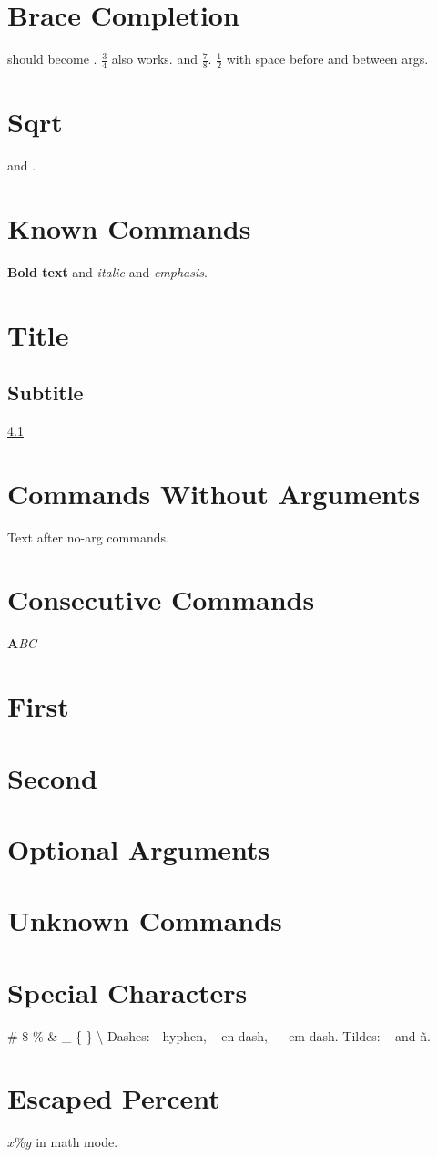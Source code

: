 \documentclass{article}
\begin{document}
\section{Brace Completion}
 should become .
 $\frac34$ also works.
 and $\frac78$.
$\frac 1 2$ with space before and between args.

\section{Sqrt}
 and .

\section{Known Commands}
\textbf{Bold text} and \textit{italic} and \emph{emphasis}.
\section{Title}
\subsection{Subtitle}
\label{sec:intro}
\ref{sec:intro}
\cite{key2024}

\section{Commands Without Arguments}
\centering
\bigskip
\noindent Text after no-arg commands.

\section{Consecutive Commands}
\textbf{A}\textit{B}\emph{C}
\section{First}\section{Second}
\label{sec:first}\label{sec:second}

\section{Optional Arguments}
\usepackage[utf8]{inputenc}

\section{Unknown Commands}
\unknown

\section{Special Characters}
\# \$ \% \& \_ \{ \} \textbackslash
Dashes: - hyphen, -- en-dash, --- em-dash.
Tildes: ~ and \~{n}.

\section{Escaped Percent}
 $x \% y$ in math mode.
\end{document}
